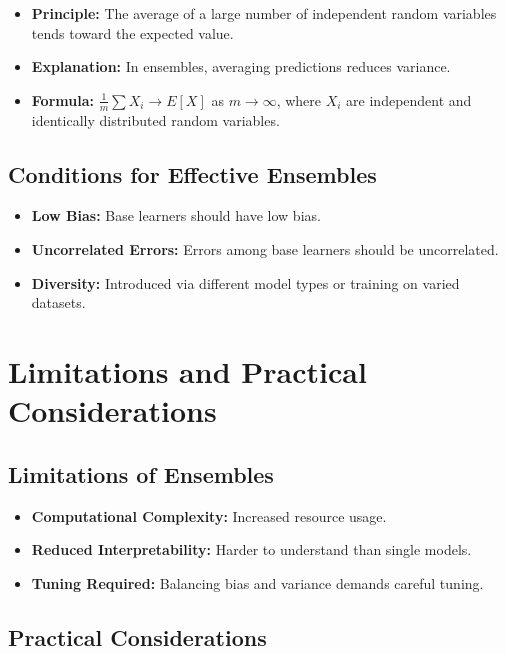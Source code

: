 \documentclass[10pt]{article}
\begin{document}
\begin{itemize}
    \item \textbf{Principle:} The average of a large number of independent random variables tends toward the expected value.
    \item \textbf{Explanation:} In ensembles, averaging predictions reduces variance.
    \item \textbf{Formula:} \(\frac{1}{m} \sum X_i \rightarrow E[X]\) as \(m \rightarrow \infty\), where \(X_i\) are independent and identically distributed random variables.
\end{itemize}

\subsection{Conditions for Effective Ensembles}

\begin{itemize}
    \item \textbf{Low Bias:} Base learners should have low bias.
    \item \textbf{Uncorrelated Errors:} Errors among base learners should be uncorrelated.
    \item \textbf{Diversity:} Introduced via different model types or training on varied datasets.
\end{itemize}

\section{Limitations and Practical Considerations}

\subsection{Limitations of Ensembles}

\begin{itemize}
    \item \textbf{Computational Complexity:} Increased resource usage.
    \item \textbf{Reduced Interpretability:} Harder to understand than single models.
    \item \textbf{Tuning Required:} Balancing bias and variance demands careful tuning.
\end{itemize}

\subsection{Practical Considerations}
\end{document}

